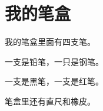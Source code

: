 \documentclass[12pt,UTF-8,openany]{ctexbook}
\begin{document}
\clearpage

\begin{center}
    
\end{center}


\hanzibox{}\hanzibox{}\hanzibox{}\hanzibox{}\hspace{1em}\hanzibox{}\hanzibox{}\hanzibox{}\hanzibox{}

\hanzibox{}\hanzibox{}\hanzibox{}\hanzibox{}\hspace{1em}\hanzibox{}\hanzibox{}\hanzibox{}\hanzibox{}

\hanzibox{}\hanzibox{}\hanzibox{}\hanzibox{}\hspace{1em}\hanzibox{}\hanzibox{}\hanzibox{}\hanzibox{}

\hanzibox{}\hanzibox{}\hanzibox{}\hanzibox{}\hspace{1em}




\chapter{我的笔盒}

\begin{large}
    
    我的笔盒里面有四支笔。
    
    一支是铅笔，一只是钢笔。
    
    一支是黑笔，一支是红笔。
    
    笔盒里还有直尺和橡皮。
    
\end{large}


\clearpage

\begin{center}
    
\end{center}


\hanzibox{}\hanzibox{}\hanzibox{}\hanzibox{}\hspace{1em}\hanzibox{}\hanzibox{}\hanzibox{}\hanzibox{}

\hanzibox{}\hanzibox{}\hanzibox{}\hanzibox{}\hspace{1em}\hanzibox{}\hanzibox{}\hanzibox{}\hanzibox{}
\end{document}
